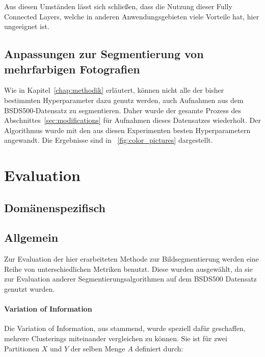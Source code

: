Aus diesen Umständen lässt sich schließen, dass die Nutzung dieser Fully Connected Layers, welche in anderen Anwendungsgebieten viele Vorteile hat, hier ungeeignet ist.

\subsection{Anpassungen zur Segmentierung von mehrfarbigen Fotografien}
\label{exp_colorpicture_optimization}

Wie in Kapitel~\ref{chap:methodik} erläutert, können nicht alle der bisher bestimmten Hyperparameter dazu genutz werden, auch Aufnahmen aus dem BSDS500-Datensatz zu segmentieren. Daher wurde der gesamte Prozess des Abschnittes~\ref{sec:modifications} für Aufnahmen dieses Datensatzes wiederholt. Der Algorithmus wurde mit den aus diesen Experimenten besten Hyperparametern angewandt. Die Ergebnisse sind in \figurename~\ref{fig:color_pictures} dargestellt.


\section{Evaluation}
\label{sec:evaluation}

\subsection{Domänenspezifisch}

\subsection{Allgemein}

Zur Evaluation der hier erarbeiteten Methode zur Bildsegmentierung werden eine Reihe von unterschiedlichen Metriken benutzt. Diese wurden ausgewählt, da sie zur Evaluation anderer Segmentierungsalgorithmen auf dem BSDS500 Datensatz \cite{bsd500} genutzt wurden. \cite{arbelaez_10, xia_17}

\paragraph{Variation of Information}

Die Variation of Information, aus \cite{meil_03} stammend, wurde speziell dafür geschaffen, mehrere Clusterings miteinander vergleichen zu können. Sie ist für zwei Partitionen $X$ und $Y$ der selben Menge $A$ definiert durch:

